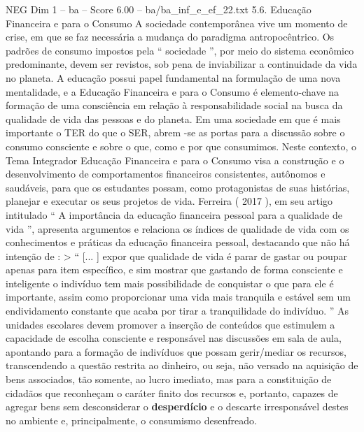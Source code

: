 \begin{textsample}{NEG Dim 1 – ba – Score 6.00 – ba/ba\_inf\_e\_ef\_22.txt}  \label{ex:f1_neg_190}
5.6.
Educação Financeira e para o Consumo A sociedade contemporânea vive um momento de crise, em que se faz necessária a mudança do paradigma antropocêntrico.
Os padrões de consumo impostos pela “ sociedade ”, por meio do sistema econômico predominante, devem ser revistos, sob pena de inviabilizar a continuidade da vida no planeta.
A educação possui papel fundamental na formulação de uma nova mentalidade, e a Educação Financeira e para o Consumo é elemento-chave na formação de uma consciência em relação à responsabilidade social na busca da qualidade de vida das pessoas e do planeta.
Em uma sociedade em que é mais importante o TER do que o SER, abrem -se as portas para a discussão sobre o consumo consciente e sobre o que, como e por que consumimos.
Neste contexto, o Tema Integrador Educação Financeira e para o Consumo visa a construção e o desenvolvimento de comportamentos financeiros consistentes, autônomos e saudáveis, para que os estudantes possam, como protagonistas de suas histórias, planejar e executar os seus projetos de vida.
Ferreira ( 2017 ), em seu artigo intitulado “ A importância da educação financeira pessoal para a qualidade de vida ”, apresenta argumentos e relaciona os índices de qualidade de vida com os conhecimentos e práticas da educação financeira pessoal, destacando que não há intenção de : > “ [... ] expor que qualidade de vida é parar de gastar ou poupar apenas para item específico, e sim mostrar que gastando de forma consciente e inteligente o indivíduo tem mais possibilidade de conquistar o que para ele é importante, assim como proporcionar uma vida mais tranquila e estável sem um endividamento constante que acaba por tirar a tranquilidade do indivíduo. ” As unidades escolares devem promover a inserção de conteúdos que estimulem a capacidade de escolha consciente e responsável nas discussões em sala de aula, apontando para a formação de indivíduos que possam gerir/mediar os recursos, transcendendo a questão restrita ao dinheiro, ou seja, não versado na aquisição de bens associados, tão somente, ao lucro imediato, mas para a constituição de cidadãos que reconheçam o caráter finito dos recursos e, portanto, capazes de agregar bens sem desconsiderar o \textbf{desperdício} e o descarte irresponsável destes no ambiente e, principalmente, o consumismo desenfreado.

\end{textsample}
